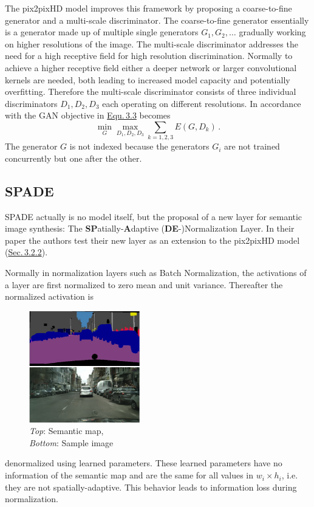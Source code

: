 The pix2pixHD model improves this framework by proposing a coarse-to-fine generator and a multi-scale discriminator. The coarse-to-fine generator essentially is a generator made up of multiple single generators ${G_1, G_2, \dots}$ gradually working on higher resolutions of the image. The multi-scale discriminator addresses the need for a high receptive field for high resolution discrimination. Normally to achieve a higher receptive field either a deeper network or larger convolutional kernels are needed, both leading to increased model capacity and potentially overfitting. Therefore the multi-scale discriminator consists of three individual discriminators $D_1, D_2, D_3$ each operating on different resolutions. In accordance with the GAN objective in \hyperref[equ:3.3]{Equ.\,3.3} becomes
%
\begin{equation}
    \underset{G}{\min}\underset{D_1,D_2,D_3}{\max}\sum_{k=1,2,3}E(G,D_k)\,.
\end{equation}
%
The generator $G$ is not indexed because the generators $G_i$ are not trained concurrently but one after the other.

\subsection{SPADE} 
SPADE \cite{spade} actually is no model itself, but the proposal of a new layer for semantic image synthesis: The \textbf{SP}atially-\textbf{A}daptive (\textbf{DE}-)Normalization Layer. In their paper the authors test their new layer as an extension to the pix2pixHD model (\hyperref[sec:3.2.2]{Sec.\,3.2.2}). 

Normally in normalization layers such as Batch Normalization, the activations of a layer are first normalized to zero mean and unit variance. Thereafter the normalized activation is 
%
\begin{figure}
    \begin{center}
        \includegraphics[width=0.43\textwidth]{Chapters/figures/spade_example.PNG}
    \end{center}
    \caption[]{\textit{Top}: Semantic map, \\\textit{Bottom}: Sample image}
\end{figure}
%
denormalized using learned parameters. These learned parameters have no information of the semantic map and are the same for all values in $w_i\times h_i$, i.e. they are not spatially-adaptive. This behavior leads to information loss during normalization.


